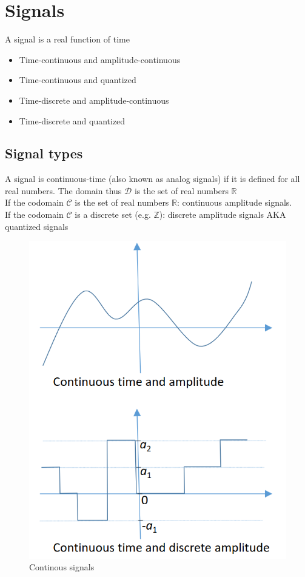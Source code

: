 \chapter{Signals}

\begin{definition}[Signal]
   A signal is a real function of time
\end{definition}
\begin{itemize}
   \item Time-continuous and amplitude-continuous
   \item Time-continuous and quantized
   \item Time-discrete and amplitude-continuous
   \item Time-discrete and quantized
\end{itemize}


\section{Signal types}
\begin{paracol}{2}
   
   \colfill
   \begin{definition}
      A signal is continuous-time (also known as analog signals) if it is defined for all real numbers.
      The domain thus $\mathcal{D}$ is the set of real numbers $\mathbb{R}$\\
      If the codomain $\mathcal{C}$ is the set of real numbers $\mathbb{R}$:
      continuous amplitude signals.\\
      If the codomain $\mathcal{C}$ is a discrete set (e.g. $\mathbb{Z}$): discrete
      amplitude signals
      AKA quantized signals
   \end{definition}
   \colfill

   \switchcolumn

   \begin{figure}[htbp]
      \centering
      \includegraphics[width=0.4\columnwidth]{images/signals_continuous.png}
      \caption{Continous signals}
      \label{fig:signals_continuous}
   \end{figure}
\end{paracol}

